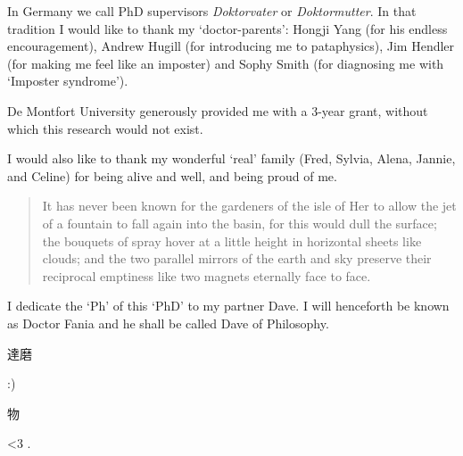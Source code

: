 
\pagestyle{fania}

\begin{wrapfigure}{L}{0.2\textwidth}
\end{wrapfigure}


In Germany we call PhD supervisors \textit{Doktorvater} or \textit{Doktormutter}. In that tradition I would like to thank my `doctor-parents': Hongji Yang (for his endless encouragement), Andrew Hugill (for introducing me to pataphysics), Jim Hendler (for making me feel like an imposter) and Sophy Smith (for diagnosing me with `Imposter syndrome').

De Montfort University generously provided me with a 3-year grant, without which this research would not exist.

I would also like to thank my wonderful `real' family (Fred, Sylvia, Alena, Jannie, and Celine) for being alive and well, and being proud of me.


\spirals


\begin{quotation}
  It has never been known for the gardeners of the isle of Her to allow the jet of a fountain to fall again into the basin, for this would dull the surface; the bouquets of spray hover at a little height in horizontal sheets like clouds; and the two parallel mirrors of the earth and sky preserve their reciprocal emptiness like two magnets eternally face to face. 
\end{quotation}


\spirals


I dedicate the `Ph' of this `PhD' to my partner Dave. I will henceforth be known as Doctor Fania and he shall be called Dave of Philosophy. 

\hspace{0cm}\textipa{[rI"mEmb@ Ti:]} \begin{CJK}{UTF8}{min}達磨\end{CJK} :) \textipa{["h\ae pi} \begin{CJK}{UTF8}{min}物\end{CJK} \textipa{"v3:s@ri]} <3 . 


